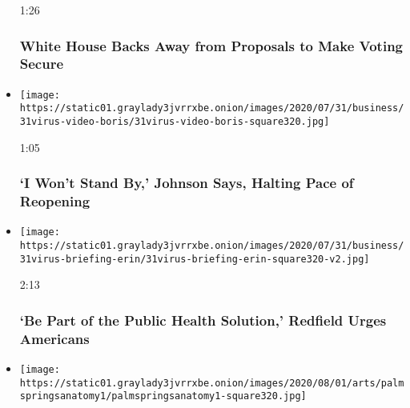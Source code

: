 \begin{itemize}
  1:26

  \hypertarget{white-house-backs-away-from-proposals-to-make-voting-secure}{%
  \subsubsection{White House Backs Away from Proposals to Make Voting
  Secure}\label{white-house-backs-away-from-proposals-to-make-voting-secure}}
\item
  \href{https://www.nytimes3xbfgragh.onion/video/us/politics/100000007266983/johnson-coronavirus-restrictions.html?action=click\&module=video-series-bar\&region=header\&pgtype=Article\&playlistId=video/latest-video}{}

  \texttt{[image: https://static01.graylady3jvrrxbe.onion/images/2020/07/31/business/31virus-video-boris/31virus-video-boris-square320.jpg]}

  1:05

  \hypertarget{i-wont-stand-by-johnson-says-halting-pace-of-reopening}{%
  \subsubsection{`I Won't Stand By,' Johnson Says, Halting Pace of
  Reopening}\label{i-wont-stand-by-johnson-says-halting-pace-of-reopening}}
\item
  \href{https://www.nytimes3xbfgragh.onion/video/us/politics/100000007266691/fauci-congress-testimony.html?action=click\&module=video-series-bar\&region=header\&pgtype=Article\&playlistId=video/latest-video}{}

  \texttt{[image: https://static01.graylady3jvrrxbe.onion/images/2020/07/31/business/31virus-briefing-erin/31virus-briefing-erin-square320-v2.jpg]}

  2:13

  \hypertarget{be-part-of-the-public-health-solution-redfield-urges-americans}{%
  \subsubsection{`Be Part of the Public Health Solution,' Redfield Urges
  Americans}\label{be-part-of-the-public-health-solution-redfield-urges-americans}}
\item
  \href{https://www.nytimes3xbfgragh.onion/video/movies/100000007265338/palm-springs-scene.html?action=click\&module=video-series-bar\&region=header\&pgtype=Article\&playlistId=video/latest-video}{}

  \texttt{[image: https://static01.graylady3jvrrxbe.onion/images/2020/08/01/arts/palmspringsanatomy1/palmspringsanatomy1-square320.jpg]}


\end{itemize}
